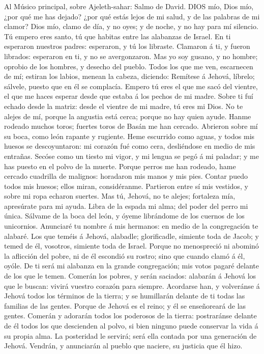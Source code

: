  Al Músico principal, sobre Ajeleth-sahar: Salmo de David.
DIOS mío, Dios mío, ¿por qué me has dejado? ¿por qué estás lejos de mi
salud, y de las palabras de mi clamor?  Dios mío, clamo de
día, y no oyes; y de noche, y no hay para mí silencio.  Tú
empero eres santo, tú que habitas entre las alabanzas de Israel.
 En ti esperaron nuestros padres: esperaron, y tú los
libraste.  Clamaron á ti, y fueron librados: esperaron en
ti, y no se avergonzaron.  Mas yo soy gusano, y no hombre;
oprobio de los hombres, y desecho del pueblo.  Todos los que
me ven, escarnecen de mí; estiran los labios, menean la cabeza,
diciendo:  Remítese á Jehová, líbrelo; sálvele, puesto que
en él se complacía.  Empero tú eres el que me sacó del
vientre, el que me haces esperar desde que estaba á los pechos de mi
madre.  Sobre ti fuí echado desde la matriz: desde el
vientre de mi madre, tú eres mi Dios.  No te alejes de mí,
porque la angustia está cerca; porque no hay quien ayude. 
Hanme rodeado muchos toros; fuertes toros de Basán me han cercado.
 Abrieron sobre mí su boca, como león rapante y rugiente.
 Heme escurrido como aguas, y todos mis huesos se
descoyuntaron: mi corazón fué como cera, desliéndose en medio de mis
entrañas.  Secóse como un tiesto mi vigor, y mi lengua se
pegó á mi paladar; y me has puesto en el polvo de la muerte.
 Porque perros me han rodeado, hame cercado cuadrilla de
malignos: horadaron mis manos y mis pies.  Contar puedo
todos mis huesos; ellos miran, considéranme.  Partieron
entre sí mis vestidos, y sobre mi ropa echaron suertes. 
Mas tú, Jehová, no te alejes; fortaleza mía, apresúrate para mi ayuda.
 Libra de la espada mi alma; del poder del perro mi única.
 Sálvame de la boca del león, y óyeme librándome de los
cuernos de los unicornios.  Anunciaré tu nombre á mis
hermanos: en medio de la congregación te alabaré.  Los que
teméis á Jehová, alabadle; glorificadle, simiente toda de Jacob; y temed
de él, vosotros, simiente toda de Israel.  Porque no
menospreció ni abominó la aflicción del pobre, ni de él escondió su
rostro; sino que cuando clamó á él, oyóle.  De ti será mi
alabanza en la grande congregación; mis votos pagaré delante de los que
le temen.  Comerán los pobres, y serán saciados: alabarán á
Jehová los que le buscan: vivirá vuestro corazón para siempre.
 Acordarse han, y volveránse á Jehová todos los términos de
la tierra; y se humillarán delante de ti todas las familias de las
gentes.  Porque de Jehová es el reino; y él se enseñoreará
de las gentes.  Comerán y adorarán todos los poderosos de
la tierra: postraránse delante de él todos los que descienden al polvo,
si bien ninguno puede conservar la vida á su propia alma. 
La posteridad le servirá; será ella contada por una generación de
Jehová.  Vendrán, y anunciarán al pueblo que naciere, su
justicia que él hizo.

